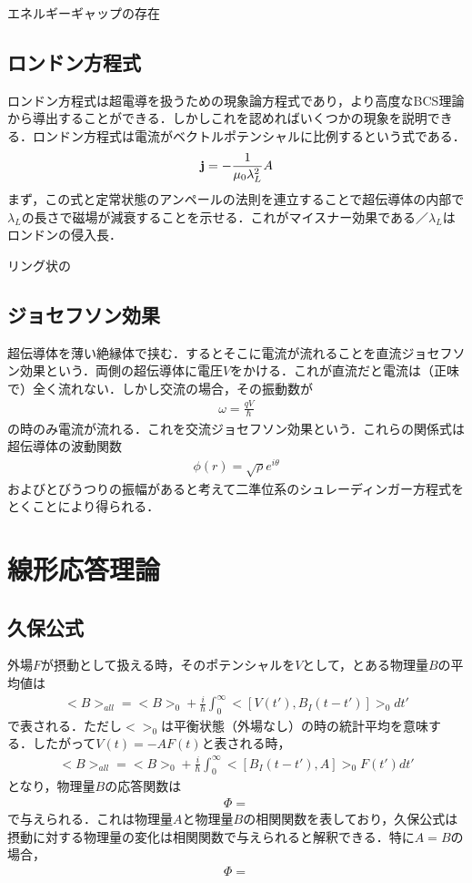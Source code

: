 \documentclass[a4j]{jarticle}
\begin{document}
エネルギーギャップの存在

\subsection{ロンドン方程式}
ロンドン方程式は超電導を扱うための現象論方程式であり，より高度なBCS理論から導出することができる．しかしこれを認めればいくつかの現象を説明できる．ロンドン方程式は電流がベクトルポテンシャルに比例するという式である．
\begin{align*}
 {\bf j}=-\frac{1}{\mu_0\lambda_L^2}A
\end{align*}
まず，この式と定常状態のアンペールの法則を連立することで超伝導体の内部で$\lambda_L$の長さで磁場が減衰することを示せる．これがマイスナー効果である／$\lambda_L$はロンドンの侵入長．

リング状の



\subsection{ジョセフソン効果}
超伝導体を薄い絶縁体で挟む．するとそこに電流が流れることを直流ジョセフソン効果という．両側の超伝導体に電圧$V$をかける．これが直流だと電流は（正味で）全く流れない．しかし交流の場合，その振動数が
\begin{align*}
 \omega =\frac{qV}{\hbar}
\end{align*}
の時のみ電流が流れる．これを交流ジョセフソン効果という．これらの関係式は超伝導体の波動関数
\begin{align*}
 \phi (r)=\sqrt{\rho}e^{i\theta}
\end{align*}
およびとびうつりの振幅があると考えて二準位系のシュレーディンガー方程式をとくことにより得られる．


\section{線形応答理論}

  \subsection{久保公式}
  外場$F$が摂動として扱える時，そのポテンシャルを$V$として，とある物理量$B$の平均値は
  \begin{align*}
   <B>_{all}=<B>_0+\frac{i}{\hbar}\int_{0}^{\infty}<[V(t'),B_I(t-t')]>_0dt'
  \end{align*}
  で表される．ただし$<>_0$は平衡状態（外場なし）の時の統計平均を意味する．したがって$V(t)=-AF(t)$と表される時，
  \begin{align*}
   <B>_{all}=<B>_0+\frac{i}{\hbar}\int_{0}^{\infty}<[B_I(t-t'),A]>_0F(t')dt'
  \end{align*}
  となり，物理量$B$の応答関数は
  \begin{align*}
   \Phi =
  \end{align*}
  で与えられる．これは物理量$A$と物理量$B$の相関関数を表しており，久保公式は摂動に対する物理量の変化は相関関数で与えられると解釈できる．特に$A=B$の場合，
  \begin{align*}
   \Phi =
  \end{align*}
  
\end{document}
